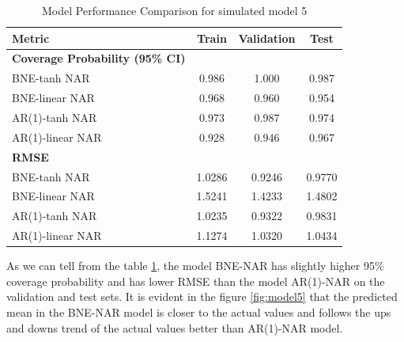 \documentclass{article}
\begin{document}
\begin{table}[htbp]
\centering
\caption{Model Performance Comparison for simulated model 5}
\label{tab:model5_comparison}
\begin{tabular}{lccc}
\toprule
\textbf{Metric} & \textbf{Train} & \textbf{Validation} & \textbf{Test} \\
\midrule
\textbf{Coverage Probability (95\% CI)} & & & \\
BNE-tanh NAR & 0.986 & 1.000 & 0.987 \\
BNE-linear NAR & 0.968 & 0.960 & 0.954 \\
AR(1)-tanh NAR & 0.973 & 0.987 & 0.974 \\
AR(1)-linear NAR & 0.928 & 0.946 & 0.967 \\
\midrule
\textbf{RMSE} & & & \\
BNE-tanh NAR & 1.0286 & 0.9246 & 0.9770 \\
BNE-linear NAR & 1.5241 & 1.4233 & 1.4802 \\
AR(1)-tanh NAR & 1.0235 & 0.9322 & 0.9831 \\
AR(1)-linear NAR & 1.1274 & 1.0320 & 1.0434 \\
\bottomrule
\end{tabular}
\end{table}

As we can tell from the table \ref{tab:model5_comparison}, the model BNE-NAR has slightly higher 95\% coverage probability and has lower RMSE than the model AR(1)-NAR on the validation and test sets. It is evident in the figure \ref{fig:model5} that the predicted mean in the BNE-NAR model is closer to the actual values and follows the ups and downs trend of the actual values better than AR(1)-NAR model. 

\newpage
\end{document}
